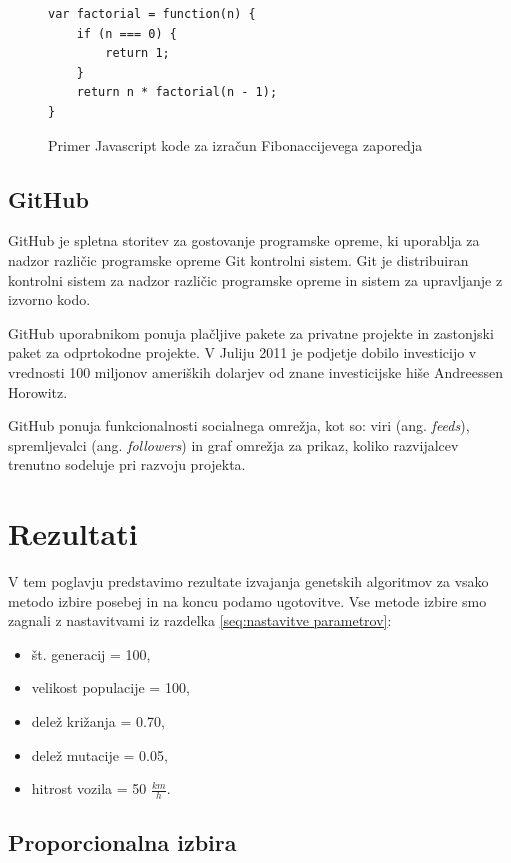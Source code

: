 \documentclass[a4paper, 12pt]{book}
\begin{document}
\begin{figure}
\begin{lstlisting}
var factorial = function(n) {
    if (n === 0) {
        return 1;
    }
    return n * factorial(n - 1);
}
\end{lstlisting}
\caption{Primer Javascript kode za izra\v cun Fibonaccijevega zaporedja}
\label{fig:javascript primer}
\end{figure}

\section{GitHub}
\label{seq:github}
GitHub je spletna storitev za gostovanje programske opreme, ki uporablja za nadzor razli\v cic programske opreme Git kontrolni sistem. Git je distribuiran kontrolni sistem za nadzor razli\v cic programske opreme in sistem za upravljanje z izvorno kodo.

GitHub uporabnikom ponuja pla\v cljive pakete za privatne projekte in zastonjski paket za odprtokodne projekte. V Juliju 2011 je podjetje dobilo investicijo v vrednosti 100 miljonov ameri\v skih dolarjev od znane investicijske hi\v se Andreessen Horowitz.

GitHub ponuja funkcionalnosti socialnega omre\v zja, kot so: viri (ang. \textit{feeds}), spremljevalci (ang. \textit{followers}) in graf omre\v zja za prikaz, koliko razvijalcev trenutno sodeluje pri razvoju projekta.
\cite{wikipedia-github}

\chapter{Rezultati}
\label{ch4}

V tem poglavju predstavimo rezultate izvajanja genetskih algoritmov za vsako metodo izbire posebej in na koncu podamo ugotovitve. Vse metode izbire smo zagnali z nastavitvami iz razdelka \ref{seq:nastavitve parametrov}:

\begin{itemize}
\item \v st. generacij = 100,
\item velikost populacije = 100,
\item dele\v z kri\v zanja = 0.70,
\item dele\v z mutacije = 0.05,
\item hitrost vozila = 50 $\frac{km}{h}$.
\end{itemize}

\section{Proporcionalna izbira}
\end{document}

